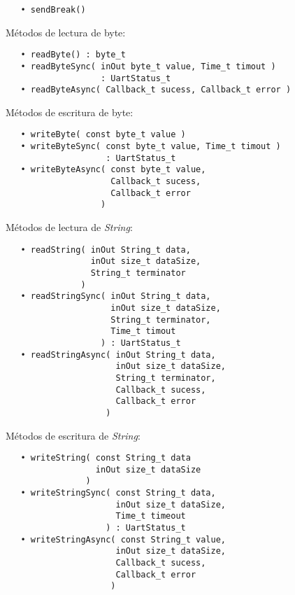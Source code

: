 \begin{verbatim}
   • sendBreak()
\end{verbatim}


Métodos de lectura de byte:

\begin{verbatim}
   • readByte() : byte_t
   • readByteSync( inOut byte_t value, Time_t timout )
                   : UartStatus_t
   • readByteAsync( Callback_t sucess, Callback_t error )
\end{verbatim}

Métodos de escritura de byte:

\begin{verbatim}
   • writeByte( const byte_t value )
   • writeByteSync( const byte_t value, Time_t timout )
                    : UartStatus_t
   • writeByteAsync( const byte_t value, 
                     Callback_t sucess,
                     Callback_t error 
                   )
\end{verbatim}

Métodos de lectura de \emph{String}:

\begin{verbatim}
   • readString( inOut String_t data,
                 inOut size_t dataSize,
                 String_t terminator
               )
   • readStringSync( inOut String_t data,
                     inOut size_t dataSize,
                     String_t terminator,
                     Time_t timout 
                   ) : UartStatus_t
   • readStringAsync( inOut String_t data,
                      inOut size_t dataSize,
   	                  String_t terminator,
                      Callback_t sucess, 
                      Callback_t error 
                    ) 
\end{verbatim}

Métodos de escritura de \emph{String}:                  
                
\begin{verbatim}  
   • writeString( const String_t data
                  inOut size_t dataSize
                )
   • writeStringSync( const String_t data,
                      inOut size_t dataSize,
                      Time_t timeout
                    ) : UartStatus_t
   • writeStringAsync( const String_t value, 
                      inOut size_t dataSize,
                      Callback_t sucess,
                      Callback_t error
                     )
\end{verbatim}

